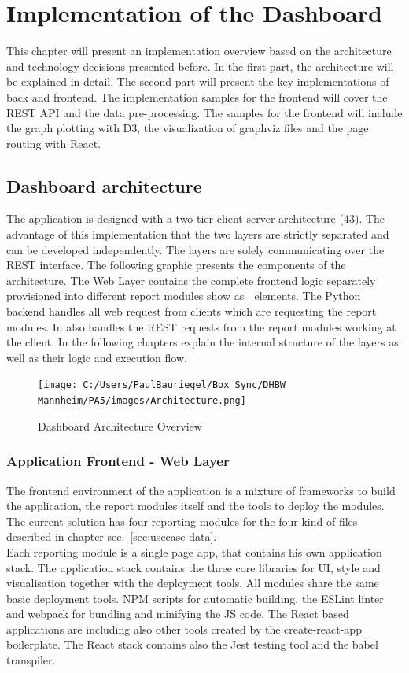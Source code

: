 \documentclass[american,a4paper,oneside,,tablecaptionabove]{scrbook}
\begin{document}
\chapter{Implementation of the
Dashboard}\label{implementation-of-the-dashboard}

This chapter will present an implementation overview based on the
architecture and technology decisions presented before. In the first
part, the architecture will be explained in detail. The second part will
present the key implementations of back and frontend. The implementation
samples for the frontend will cover the REST API and the data
pre-processing. The samples for the frontend will include the graph
plotting with D3, the visualization of graphviz files and the page
routing with React.

\section{Dashboard architecture}\label{dashboard-architecture}

The application is designed with a two-tier client-server architecture
(43). The advantage of this implementation that the two layers are
strictly separated and can be developed independently. The layers are
solely communicating over the REST interface. The following graphic
presents the components of the architecture. The Web Layer contains the
complete frontend logic separately provisioned into different report
modules show as 📄 elements. The Python backend handles all web request
from clients which are requesting the report modules. In also handles
the REST requests from the report modules working at the client. In the
following chapters explain the internal structure of the layers as well
as their logic and execution flow.

\begin{figure}
\centering
\texttt{[image: C:/Users/PaulBauriegel/Box Sync/DHBW Mannheim/PA5/images/Architecture.png]}
\caption{Dashboard Architecture Overview}
\end{figure}

\subsection{Application Frontend - Web
Layer}\label{application-frontend---web-layer}

The frontend environment of the application is a mixture of frameworks
to build the application, the report modules itself and the tools to
deploy the modules. The current solution has four reporting modules for
the four kind of files described in chapter
sec.~\ref{sec:usecase-data}.\\
Each reporting module is a single page app, that contains his own
application stack. The application stack contains the three core
libraries for UI, style and visualisation together with the deployment
tools. All modules share the same basic deployment tools. NPM scripts
for automatic building, the ESLint linter and webpack for bundling and
minifying the JS code. The React based applications are including also
other tools created by the create-react-app boilerplate. The React stack
contains also the Jest testing tool and the babel transpiler.
\end{document}

